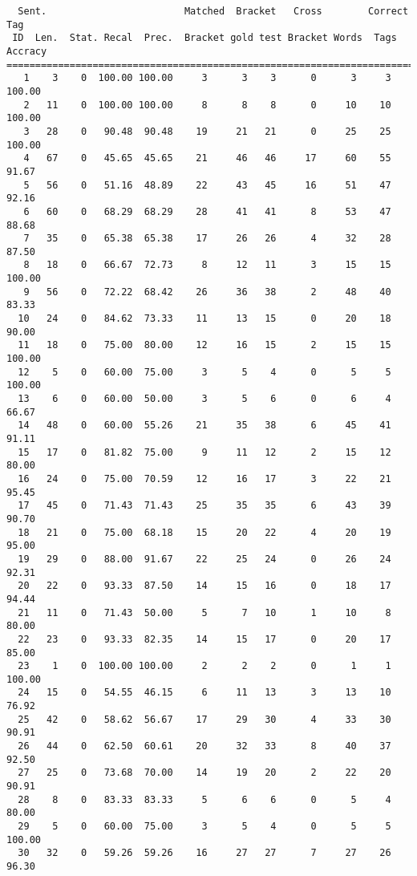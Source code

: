 \scriptsize
\begin{verbatim}
  Sent.                        Matched  Bracket   Cross        Correct Tag
 ID  Len.  Stat. Recal  Prec.  Bracket gold test Bracket Words  Tags Accracy
============================================================================
   1    3    0  100.00 100.00     3      3    3      0      3     3   100.00
   2   11    0  100.00 100.00     8      8    8      0     10    10   100.00
   3   28    0   90.48  90.48    19     21   21      0     25    25   100.00
   4   67    0   45.65  45.65    21     46   46     17     60    55    91.67
   5   56    0   51.16  48.89    22     43   45     16     51    47    92.16
   6   60    0   68.29  68.29    28     41   41      8     53    47    88.68
   7   35    0   65.38  65.38    17     26   26      4     32    28    87.50
   8   18    0   66.67  72.73     8     12   11      3     15    15   100.00
   9   56    0   72.22  68.42    26     36   38      2     48    40    83.33
  10   24    0   84.62  73.33    11     13   15      0     20    18    90.00
  11   18    0   75.00  80.00    12     16   15      2     15    15   100.00
  12    5    0   60.00  75.00     3      5    4      0      5     5   100.00
  13    6    0   60.00  50.00     3      5    6      0      6     4    66.67
  14   48    0   60.00  55.26    21     35   38      6     45    41    91.11
  15   17    0   81.82  75.00     9     11   12      2     15    12    80.00
  16   24    0   75.00  70.59    12     16   17      3     22    21    95.45
  17   45    0   71.43  71.43    25     35   35      6     43    39    90.70
  18   21    0   75.00  68.18    15     20   22      4     20    19    95.00
  19   29    0   88.00  91.67    22     25   24      0     26    24    92.31
  20   22    0   93.33  87.50    14     15   16      0     18    17    94.44
  21   11    0   71.43  50.00     5      7   10      1     10     8    80.00
  22   23    0   93.33  82.35    14     15   17      0     20    17    85.00
  23    1    0  100.00 100.00     2      2    2      0      1     1   100.00
  24   15    0   54.55  46.15     6     11   13      3     13    10    76.92
  25   42    0   58.62  56.67    17     29   30      4     33    30    90.91
  26   44    0   62.50  60.61    20     32   33      8     40    37    92.50
  27   25    0   73.68  70.00    14     19   20      2     22    20    90.91
  28    8    0   83.33  83.33     5      6    6      0      5     4    80.00
  29    5    0   60.00  75.00     3      5    4      0      5     5   100.00
  30   32    0   59.26  59.26    16     27   27      7     27    26    96.30

\end{verbatim}
